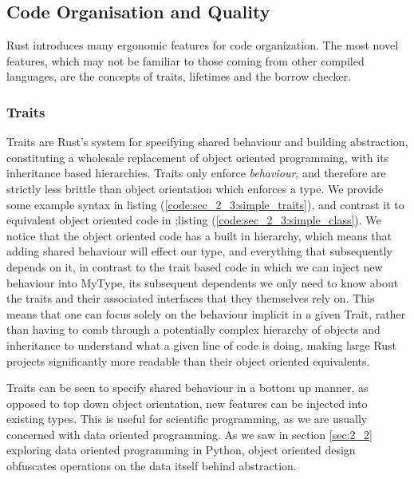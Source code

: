 \subsection*{Code Organisation and Quality}

Rust introduces many ergonomic features for code organization. The most novel features, which may not be familiar to those coming from other compiled languages, are the concepts of traits, lifetimes and the borrow checker.

\subsubsection*{Traits}

Traits are Rust's system for specifying shared behaviour and building abstraction, constituting a wholesale replacement of object oriented programming, with its inheritance based hierarchies. Traits only enforce \textit{behaviour}, and therefore are strictly less brittle than object orientation which enforces a type. We provide some example syntax in listing (\ref{code:sec_2_3:simple_traits}), and contrast it to equivalent object oriented code in ;listing (\ref{code:sec_2_3:simple_class}). We notice that the object oriented code has a built in hierarchy, which means that adding shared behaviour will effect our  type, and everything that subsequently depends on it, in contrast to the trait based code in which we can inject new behaviour into MyType, its subsequent dependents we only need to know about the traits and their associated interfaces that they themselves rely on. This means that one can focus solely on the behaviour implicit in a given Trait, rather than having to comb through a potentially complex hierarchy of objects and inheritance to understand what a given line of code is doing, making large Rust projects significantly more readable than their object oriented equivalents.

Traits can be seen to specify shared behaviour in a bottom up manner, as opposed to top down object orientation, new features can be injected into existing types. This is useful for scientific programming, as we are usually concerned with data oriented programming. As we saw in section \ref{sec:2_2} exploring data oriented programming in Python, object oriented design obfuscates operations on the data itself behind abstraction.


